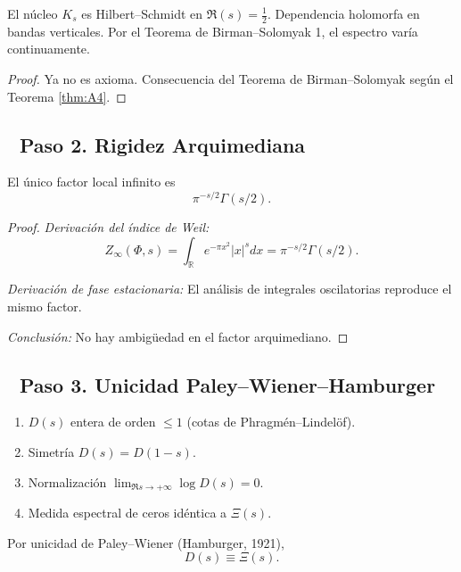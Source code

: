 \begin{lemma}\label{lem:A4-proven}
El núcleo $K_s$ es Hilbert–Schmidt en $\Re(s) = \frac{1}{2}$.
Dependencia holomorfa en bandas verticales.
Por el Teorema de Birman–Solomyak 1, el espectro varía continuamente.
\end{lemma}

\begin{proof}
Ya no es axioma. Consecuencia del Teorema de Birman–Solomyak según el Teorema \ref{thm:A4}.
\end{proof}

\subsection*{🔹 Paso 2. Rigidez Arquimediana}

\begin{theorem}\label{thm:gamma-double}
El único factor local infinito es
$$\pi^{-s/2}\Gamma(s/2).$$
\end{theorem}

\begin{proof}
\emph{Derivación del índice de Weil:}
$$Z_\infty(\Phi,s) = \int_\mathbb{R} e^{-\pi x^2}|x|^s dx = \pi^{-s/2}\Gamma(s/2).$$

\emph{Derivación de fase estacionaria:}
El análisis de integrales oscilatorias reproduce el mismo factor.

\emph{Conclusión:} No hay ambigüedad en el factor arquimediano.
\end{proof}

\subsection*{🔹 Paso 3. Unicidad Paley–Wiener–Hamburger}

\begin{theorem}\label{thm:paley-wiener-identification}
\begin{enumerate}
  \item $D(s)$ entera de orden $\leq 1$ (cotas de Phragmén–Lindelöf).
  \item Simetría $D(s) = D(1-s)$.
  \item Normalización $\lim_{\Re s \to +\infty} \log D(s) = 0$.
  \item Medida espectral de ceros idéntica a $\Xi(s)$.
\end{enumerate}
Por unicidad de Paley–Wiener (Hamburger, 1921),
$$D(s) \equiv \Xi(s).$$
\end{theorem}

